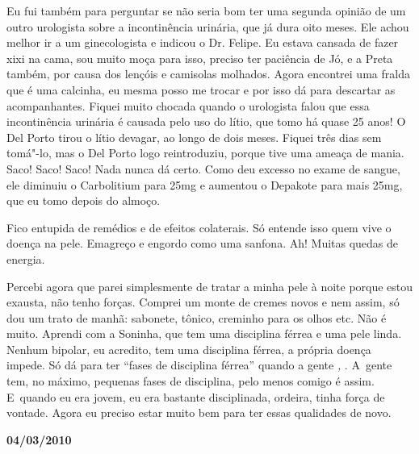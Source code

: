 Eu fui também para perguntar se não seria bom ter uma segunda opinião de
um outro urologista sobre a incontinência urinária, que já dura oito
meses. Ele achou melhor ir a um ginecologista e indicou o Dr. Felipe. Eu
estava cansada de fazer xixi na cama, sou muito moça para isso, preciso
ter paciência de Jó, e a Preta também, por causa dos lençóis e camisolas
molhados. Agora encontrei uma fralda que é uma calcinha, eu mesma posso
me trocar e por isso dá para descartar as acompanhantes. Fiquei muito
chocada quando o urologista falou que essa incontinência urinária é
causada pelo uso do lítio, que tomo há quase 25 anos! O Del Porto tirou
o lítio devagar, ao longo de dois meses. Fiquei três dias sem tomá"-lo,
mas o Del Porto logo reintroduziu, porque tive uma ameaça de mania.
Saco! Saco! Saco! Nada nunca dá certo. Como deu excesso no exame de
sangue, ele diminuiu o Carbolitium para 25mg e aumentou o Depakote para
mais 25mg, que eu tomo depois do almoço.

Fico entupida de remédios e de efeitos colaterais. Só entende isso quem
vive o doença na pele. Emagreço e engordo como uma sanfona. Ah! Muitas
quedas de energia.

Percebi agora que parei simplesmente de tratar a minha pele à noite
porque estou exausta, não tenho forças. Comprei um monte de cremes novos
e nem assim, só dou um trato de manhã: sabonete, tônico, creminho para
os olhos etc. Não é muito. Aprendi com a Soninha, que tem uma disciplina
férrea e uma pele linda. Nenhum bipolar, eu acredito, tem uma disciplina
férrea, a própria doença impede. Só dá para ter ``fases de disciplina
férrea'' quando a gente  \emph{,}  . A~gente tem, no
máximo, pequenas fases de disciplina, pelo menos comigo é assim. E~quando eu era jovem, eu era bastante disciplinada, ordeira, tinha força
de vontade. Agora eu preciso estar muito bem para ter essas
qualidades de novo.

\begin{center}\textbf{\asterisc{}}\end{center}


\begin{flushright}\textbf{04/03/2010}\end{flushright}


